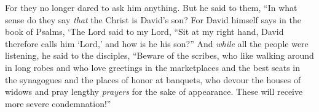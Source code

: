 \begin{biblechapter}
\verse For they no longer dared to ask him anything.
 But he said to them, “In what sense do they say \textit{that} the Christ is David’s son?
\verse For David himself says in the book of Psalms,
\verse ‘The Lord said to my Lord, 
“Sit at my right hand,
\verse David therefore calls him ‘Lord,’ and how is he his son?”
 And \textit{while} all the people were listening, he said to the disciples,
\verse “Beware of the scribes, who like walking around in long robes and who love greetings in the marketplaces and the best seats in the synagogues and the places of honor at banquets,
\verse who devour the houses of widows and pray lengthy \textit{prayers} for the sake of appearance. These will receive more severe condemnation!”
\end{biblechapter}

